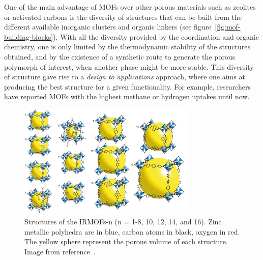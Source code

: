 \documentclass[thesis]{subfiles}
\begin{document}
One of the main advantage of MOFs over other porous materials such as zeolites
or activated carbons is the diversity of structures that can be built from the
different available inorganic clusters and organic linkers (see
figure~\ref{fig:mof-building-blocks}). With all the diversity provided by the
coordination and organic chemistry, one is only limited by the thermodynamic
stability of the structures obtained, and by the existence of a synthetic route
to generate the porous polymorph of interest, when another phase might be more
stable. This diversity of structure gave rise to a \emph{design to applications}
approach, where one aims at producing the best structure for a given
functionality. For example, researchers have reported MOFs with the highest
methane\cite{Tian2017} or hydrogen\cite{Oh2017} uptakes until now.

\begin{figure}[hb]
    \centering
    \includegraphics[width=0.75\textwidth]{figures/cited/irmof-all-sizes}
    \caption{Structures of the IRMOFs-n (n = 1-8, 10, 12, 14, and 16). Zinc
    metallic polyhedra are in blue, carbon atoms in black, oxygen in red. The
    yellow sphere represent the porous volume of each structure. Image from
    reference~\cite{Eddaoudi2002}.}
    \label{fig:irmof-all-sizes}
\end{figure}
\end{document}

